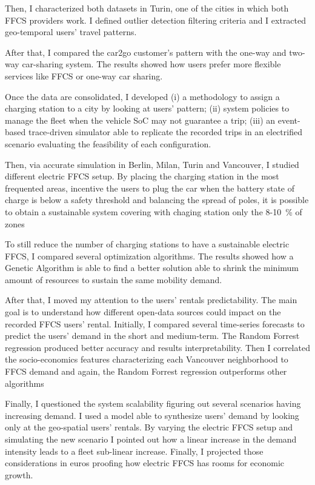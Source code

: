 \documentclass[%
   corpo=12pt, %
   oneside, %
   tipotesi=scudo,
   mybibliostyle, %
  numerazioneromana, %
   ]{toptesi}
\begin{document}
Then, I characterized both datasets in Turin, one of the cities in which both FFCS providers work. I defined outlier detection filtering criteria and I extracted geo-temporal users' travel patterns.

After that, I compared the car2go customer's pattern with the one-way and two-way car-sharing system. The results showed how users prefer more flexible services like FFCS or one-way car sharing.

Once the data are consolidated, I developed (i) a methodology to assign a charging station to a city by looking at users' pattern; (ii) system policies to manage the fleet when the vehicle SoC may not guarantee a trip; (iii) an event-based trace-driven simulator able to replicate the recorded trips in an electrified scenario evaluating the feasibility of each configuration. 

Then, via accurate simulation in Berlin, Milan, Turin and Vancouver, I studied different electric FFCS setup. By placing the charging station in the most frequented areas, incentive the users to plug the car when the battery state of charge is below a safety threshold and balancing the spread of poles, it is possible to obtain a sustainable system covering with chaging station only the 8-10~\% of zones


To still reduce the number of charging stations to have a sustainable electric FFCS, I compared several optimization algorithms. The results showed how a Genetic Algorithm is able to find a better solution able to shrink the minimum amount of resources to sustain the same mobility demand.

After that, I moved my attention to the users' rentals predictability. The main goal is to understand how different open-data sources could impact on the recorded FFCS users' rental. Initially, I compared several time-series forecasts to predict the users' demand in the short and medium-term. The Random Forrest regression produced better accuracy and results interpretability. Then I correlated the socio-economics features characterizing each Vancouver neighborhood to FFCS demand and again, the Random Forrest regression outperforms other algorithms

Finally, I questioned the system scalability figuring out several scenarios having increasing demand. I used a model able to synthesize users' demand by looking only at the geo-spatial users' rentals. By varying the electric FFCS setup and simulating the new scenario I pointed out how a linear increase in the demand intensity leads to a fleet sub-linear increase. Finally, I projected those considerations in euros proofing how electric FFCS has rooms for economic growth. 
\end{document}

